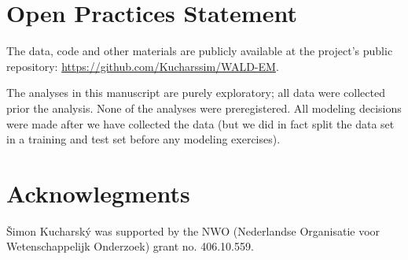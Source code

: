 \documentclass{article}
\begin{document}
\section*{Open Practices Statement}

The data, code and other materials are publicly available at the project's public repository: \url{https://github.com/Kucharssim/WALD-EM}.

The analyses in this manuscript are purely exploratory; all data were collected prior the analysis. None of the analyses were preregistered. All modeling decisions were made after we have collected the data (but we did in fact split the data set in a training and test set before any modeling exercises).

\section*{Acknowlegments}
Šimon Kucharský was supported by the NWO (Nederlandse Organisatie voor Wetenschappelijk Onderzoek) grant no. 406.10.559.



\end{document}
